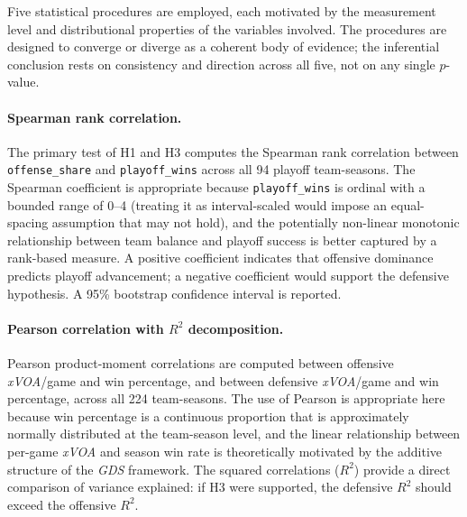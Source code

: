 \documentclass[12pt,a4paper]{article}
\newcommand{\xvoa}{\textit{xVOA}}
\newcommand{\gds}{\textit{GDS}}
\begin{document}
Five statistical procedures are employed, each motivated by the measurement level and distributional properties of the variables involved. The procedures are designed to converge or diverge as a coherent body of evidence; the inferential conclusion rests on consistency and direction across all five, not on any single $p$-value.

\paragraph{Spearman rank correlation.} The primary test of H1 and H3 computes the Spearman rank correlation between \texttt{offense\_share} and \texttt{playoff\_wins} across all 94 playoff team-seasons. The Spearman coefficient is appropriate because \texttt{playoff\_wins} is ordinal with a bounded range of 0--4 (treating it as interval-scaled would impose an equal-spacing assumption that may not hold), and the potentially non-linear monotonic relationship between team balance and playoff success is better captured by a rank-based measure. A positive coefficient indicates that offensive dominance predicts playoff advancement; a negative coefficient would support the defensive hypothesis. A 95\% bootstrap confidence interval is reported.

\paragraph{Pearson correlation with $R^2$ decomposition.} Pearson product-moment correlations are computed between offensive \xvoa{}/game and win percentage, and between defensive \xvoa{}/game and win percentage, across all 224 team-seasons. The use of Pearson is appropriate here because win percentage is a continuous proportion that is approximately normally distributed at the team-season level, and the linear relationship between per-game \xvoa{} and season win rate is theoretically motivated by the additive structure of the \gds{} framework. The squared correlations ($R^2$) provide a direct comparison of variance explained: if H3 were supported, the defensive $R^2$ should exceed the offensive $R^2$.
\end{document}
